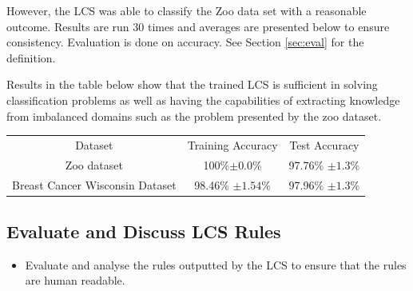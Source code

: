 However, the LCS was able to classify the Zoo data set with a reasonable outcome. Results are run 30 times and averages are presented below to ensure consistency. Evaluation is done on accuracy. See Section \ref{sec:eval} for the definition.

Results in the table below show that the trained LCS is sufficient in solving classification problems as well as having the capabilities of extracting knowledge from imbalanced domains such as the problem presented by the zoo dataset.

\begin{center}
	\begin{tabular}{ |c|c|c| } 
		\hline
		Dataset & Training Accuracy & Test Accuracy \\ 
		Zoo dataset & 100\%$\pm0.0\% $ & 97.76\% $\pm1.3\% $ \\ 
		Breast Cancer Wisconsin Dataset & 98.46\% $ \pm1.54\% $& 97.96\% $ \pm1.3\% $\\ 
		\hline
	\end{tabular}
\end{center}


\subsection{Evaluate and Discuss LCS Rules}
\begin{itemize}
	\item  Evaluate and analyse the rules outputted by the LCS to ensure that the rules are
human readable.

\end{itemize}


